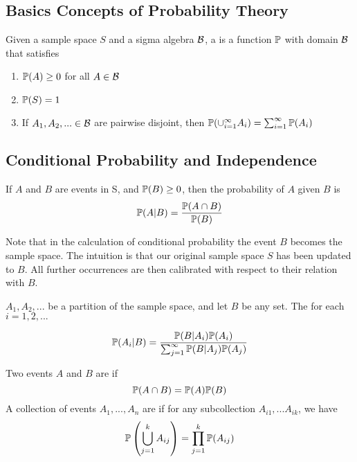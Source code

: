 \subsection{Basics Concepts of Probability Theory}
\begin{definition}
    Given a sample space $S$ and a sigma algebra $\mathcal B$, a  is a function $\mathbb P$ with domain $\mathcal B$ that satisfies
    \begin{enumerate}
        \item $\mathbb P(A) \geq 0$ for all $A \in \mathcal B$
        \item $\mathbb P(S) = 1$
        \item If $A_1, A_2,... \in \mathcal B$ are pairwise disjoint, then $\mathbb P(\cup_{i=1}^{\infty}A_i) = \sum_{i=1}^{\infty}\mathbb P(A_i)$
    \end{enumerate}
\end{definition}


\subsection{Conditional Probability and Independence}
\begin{definition}
    If $A$ and $B$ are events in S, and $\mathbb P(B) \geq 0$, then the  probability of $A$ given $B$ is
    $$
    \mathbb P(A|B) = \frac{\mathbb P(A \cap B)}{\mathbb P(B)}
    $$
\end{definition}
Note that in the calculation of conditional probability the event $B$ becomes the sample space. The intuition is that our original sample space $S$ has been updated to $B$. All further occurrences are then calibrated with respect to their relation with $B$.

\begin{theorem}

$A_1, A_2,...$ be a partition of the sample space, and let $B$ be any set. The for each $i = 1,2,...$

$$
\mathbb P(A_i|B) = \frac{\mathbb P(B|A_i)\mathbb P(A_i)}{\sum_{j=1}^{\infty}\mathbb P(B|A_j)\mathbb P(A_j)}
$$
\end{theorem}

\begin{definition}
    Two events $A$ and $B$ are  if
    $$
    \mathbb P(A \cap B) = \mathbb P(A)\mathbb P(B)
    $$
    A collection of events $A_1,...,A_n$ are  if for any subcollection $A_{i1},...A_{ik}$, we have 
    $$
    \mathbb P\left( \bigcup_{j=1}^{k}A_{ij} \right ) = \prod_{j=1}^{k} \mathbb P(A_{ij})
    $$
\end{definition}

